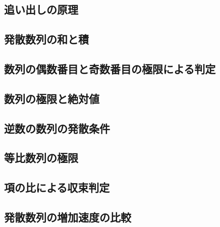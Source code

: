 \documentclass[../../imaging-math]{subfiles}
\begin{document}
\subsection{追い出しの原理}


\subsection{発散数列の和と積}


\subsection{数列の偶数番目と奇数番目の極限による判定}


\subsection{数列の極限と絶対値}


\subsection{逆数の数列の発散条件}


\subsection{等比数列の極限}


\subsection{項の比による収束判定}


\subsection{発散数列の増加速度の比較}

\end{document}
